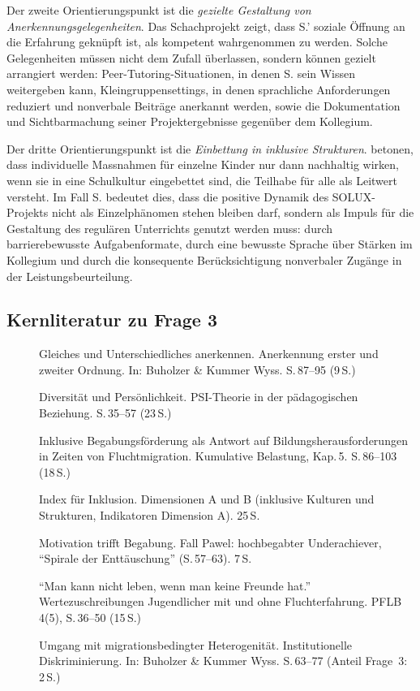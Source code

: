 \documentclass[ngerman, a4paper]{article}
\begin{document}
Der zweite Orientierungspunkt ist die \textit{gezielte Gestaltung von
Anerkennungsgelegenheiten}. Das Schachprojekt zeigt, dass S.' soziale Öffnung an
die Erfahrung geknüpft ist, als kompetent wahrgenommen zu werden. Solche
Gelegenheiten müssen nicht dem Zufall überlassen, sondern können gezielt arrangiert
werden: Peer-Tutoring-Situationen, in denen S. sein Wissen weitergeben kann,
Kleingruppensettings, in denen sprachliche Anforderungen reduziert und nonverbale
Beiträge anerkannt werden, sowie die Dokumentation und Sichtbarmachung seiner
Projektergebnisse gegenüber dem Kollegium.

Der dritte Orientierungspunkt ist die \textit{Einbettung in inklusive Strukturen}.
\textcite[Dim.\,A--B]{booth2019index} betonen, dass individuelle Massnahmen für einzelne Kinder nur dann
nachhaltig wirken, wenn sie in eine Schulkultur eingebettet sind, die Teilhabe für
alle als Leitwert versteht. Im Fall S. bedeutet dies, dass die positive Dynamik des
SOLUX-Projekts nicht als Einzelphänomen stehen bleiben darf, sondern als Impuls für
die Gestaltung des regulären Unterrichts genutzt werden muss: durch barrierebewusste
Aufgabenformate, durch eine bewusste Sprache über Stärken im Kollegium und durch die
konsequente Berücksichtigung nonverbaler Zugänge in der Leistungsbeurteilung.
 
\subsection{Kernliteratur zu Frage 3}
 
\begin{description}
  \item[\cite{grossrieder2010anerkennung}] Gleiches und Unterschiedliches
    anerkennen. Anerkennung erster und zweiter Ordnung.
    In: Buholzer \& Kummer Wyss. S.\,87--95 (9\,S.)
  \item[\cite{kuhl2019diversitaet}] Diversität und Persönlichkeit.
    PSI-Theorie in der pädagogischen Beziehung. S.\,35--57 (23\,S.)
  \item[\cite{behrensen2019inklusive}] Inklusive Begabungsförderung als Antwort
    auf Bildungsherausforderungen in Zeiten von Fluchtmigration.
    Kumulative Belastung, Kap.\,5. S.\,86--103 (18\,S.)
  \item[\cite{booth2019index}] Index für Inklusion. Dimensionen A und B
    (inklusive Kulturen und Strukturen, Indikatoren Dimension A). 25\,S.
  \item[\cite{lehwald2017motivation}] Motivation trifft Begabung.
    Fall Pawel: hochbegabter Underachiever, \enquote{Spirale der Enttäuschung}
    (S.\,57--63). 7\,S.
  \item[\cite{baumert2022freundschaftwerte}] \enquote{Man kann nicht leben,
    wenn man keine Freunde hat.} Wertezuschreibungen Jugendlicher mit und
    ohne Fluchterfahrung. PFLB 4(5), S.\,36--50 (15\,S.)
  \item[\cite{kappus2010migration}] Umgang mit migrationsbedingter
    Heterogenität. Institutionelle Diskriminierung.
    In: Buholzer \& Kummer Wyss. S.\,63--77 (Anteil Frage~3: 2\,S.)
\end{description}
 
\end{document}
